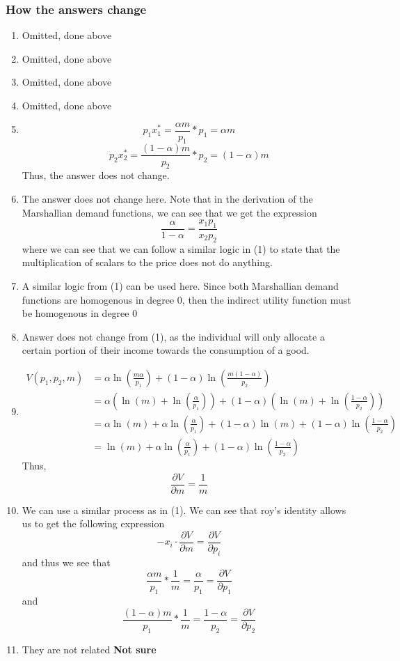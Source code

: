 \documentclass[12pt]{article}
\begin{document}
\subsubsection*{How the answers change}
\begin{enumerate}[label=\alph*]
    \item Omitted, done above
    \item Omitted, done above
    \item Omitted, done above
    \item Omitted, done above
    \item 
    \[
    p_1 x_1^* = \frac{\alpha m}{p_1} * p_1 = \alpha m 
    \]
    \[
    p_2 x_2^* = \frac{(1-\alpha)m}{p_2} * p_2 = (1-\alpha) m 
    \]
    Thus, the answer does not change.
    \item The answer does not change here. Note that in the derivation of the Marshallian demand functions, we can see that we get the expression
    \[
\frac{\alpha}{1-\alpha} = \frac{x_1 p_1}{x_2p_2}
    \]
    where we can see that we can follow a similar logic in (1) to state that the multiplication of scalars to the price does not do anything.
    \item A similar logic from (1) can be used here. Since both Marshallian demand functions are homogenous in degree 0, then the indirect utility function must be homogenous in degree 0
    \item Answer does not change from (1), as the individual will only allocate a certain portion of their income towards the consumption of a good. 
    \item \begin{align*}
        V(p_1, p_2, m) &= \alpha \ln\left(\frac{m \alpha}{p_1}\right) + (1-\alpha) \ln\left(\frac{m(1-\alpha)}{p_2}\right)\\
        &= \alpha \left( \ln(m) + \ln \left( \frac{\alpha}{p_1} \right) \right) + (1-\alpha)\left( \ln(m) + \ln \left( \frac{1-\alpha}{p_2} \right) \right)\\
        &= \alpha \ln(m) + \alpha \ln \left( \frac{\alpha}{p_1} \right) + (1-\alpha) \ln(m) + (1-\alpha) \ln \left( \frac{1-\alpha}{p_2} \right)\\
        &= \ln(m) +  \alpha \ln \left( \frac{\alpha}{p_1} \right) + (1-\alpha) \ln \left( \frac{1-\alpha}{p_2} \right)
    \end{align*}
    Thus, 
    \[
    \frac{\partial V}{\partial m} = \frac{1}{m}
    \]
    \item We can use a similar process as in (1). We can see that roy's identity allows us to get the following expression
    \[
        - x_i \cdot \frac{\partial V}{\partial m} = \frac{\partial V}{\partial p_i}
    \]
    and thus we see that 
    \[
    \frac{\alpha m}{p_1} * \frac{1}{m} = \frac{\alpha}{p_1} = \frac{\partial V}{\partial p_1}
    \]
    and 
    \[
    \frac{(1-\alpha)m }{p_1} * \frac{1}{m} = \frac{1-\alpha}{p_2} = \frac{\partial V}{\partial p_2}
    \]
    \item They are not related \textbf{Not sure}
\end{enumerate}
\end{document}
